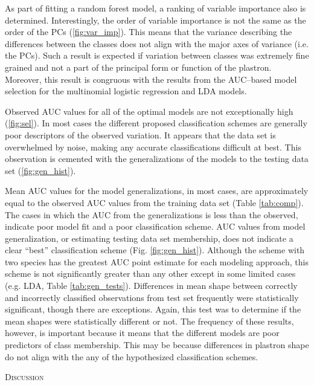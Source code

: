 \documentclass[12pt,letterpaper]{article}
\renewcommand{\section}[1]{%
\bigskip
\begin{center}
\begin{Large}
\normalfont\scshape #1
\medskip
\end{Large}
\end{center}}
\begin{document}
As part of fitting a random forest model, a ranking of variable importance also is determined. Interestingly, the order of variable importance is not the same as the order of the PCs (\ref{fig:var_imp}). This means that the variance describing the differences between the classes does not align with the major axes of variance (i.e. the PCs). Such a result is expected if variation between classes was extremely fine grained and not a part of the principal form or function of the plastron. Moreover, this result is congruous with the results from the AUC--based model selection for the multinomial logistic regression and LDA models.

Observed AUC values for all of the optimal models are not exceptionally high (\ref{fig:sel}). In most cases the different proposed classification schemes are generally poor descriptors of the observed variation. It appears that the data set is overwhelmed by noise, making any accurate classifications difficult at best. This observation is cemented with the generalizations of the models to the testing data set (\ref{fig:gen_hist}).

Mean AUC values for the model generalizations, in most cases, are approximately equal to the observed AUC values from the training data set (Table \ref{tab:comp}). The  cases in which the AUC from the  generalizations is less than the observed, indicate poor model fit and a poor classification scheme. AUC values from model generalization, or estimating testing data set membership, does not indicate a clear ``best'' classification scheme (Fig. \ref{fig:gen_hist}). Although the scheme with two species has the greatest AUC point estimate for each modeling approach, this scheme is not significantly greater than any other except in some limited cases (e.g. LDA, Table \ref{tab:gen_tests}). 
Differences in mean shape between correctly and incorrectly classified observations from test set frequently were statistically significant, though there are exceptions. Again, this test was to determine if the mean shapes were statistically different or not. The frequency of these results, however, is important because it means that the different models are poor predictors of class membership. This may be because differences in plastron shape do not align with the any of the hypothesized classification schemes.


\section{Discussion}
\end{document}
